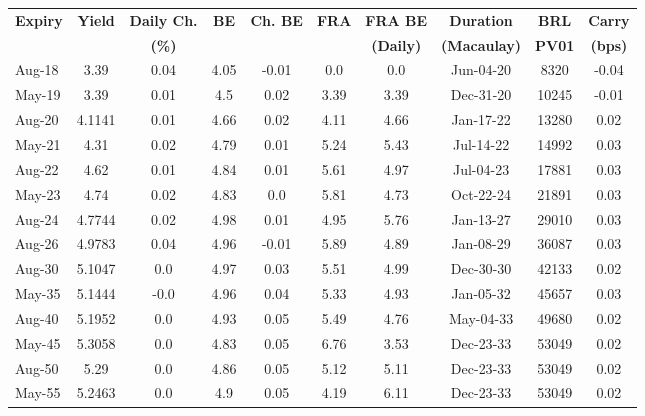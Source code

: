 \documentclass[article,crop=false]{standalone}%
\begin{document}
%
\normalsize%
\setlength{\tabcolsep}{0.15cm}%
\begin{tabular}[h]{l|c c|c c|c c|c c c}%
\hline%
\rowcolor{white}%
\textbf{Expiry}&\textbf{Yield}&\textbf{Daily Ch.}&\textbf{BE}&\textbf{Ch. BE}&\textbf{FRA}&\textbf{FRA BE}&\textbf{Duration}&\textbf{BRL}&\textbf{Carry}\\%
\rowcolor{white}%
\textbf{}&\textbf{}&\textbf{(\%)}&\textbf{}&\textbf{}&\textbf{}&\textbf{(Daily)}&\textbf{(Macaulay)}&\textbf{PV01}&\textbf{(bps)}\\%
\hline%
\rowcolor{lightgray}%
Aug{-}18&3.39&0.04&4.05&{-}0.01&0.0&0.0&Jun{-}04{-}20&8320&{-}0.04\\%
\rowcolor{white}%
May{-}19&3.39&0.01&4.5&0.02&3.39&3.39&Dec{-}31{-}20&10245&{-}0.01\\%
\rowcolor{lightgray}%
Aug{-}20&4.1141&0.01&4.66&0.02&4.11&4.66&Jan{-}17{-}22&13280&0.02\\%
\rowcolor{white}%
May{-}21&4.31&0.02&4.79&0.01&5.24&5.43&Jul{-}14{-}22&14992&0.03\\%
\rowcolor{lightgray}%
Aug{-}22&4.62&0.01&4.84&0.01&5.61&4.97&Jul{-}04{-}23&17881&0.03\\%
\rowcolor{white}%
May{-}23&4.74&0.02&4.83&0.0&5.81&4.73&Oct{-}22{-}24&21891&0.03\\%
\rowcolor{lightgray}%
Aug{-}24&4.7744&0.02&4.98&0.01&4.95&5.76&Jan{-}13{-}27&29010&0.03\\%
\rowcolor{white}%
Aug{-}26&4.9783&0.04&4.96&{-}0.01&5.89&4.89&Jan{-}08{-}29&36087&0.03\\%
\rowcolor{lightgray}%
Aug{-}30&5.1047&0.0&4.97&0.03&5.51&4.99&Dec{-}30{-}30&42133&0.02\\%
\rowcolor{white}%
May{-}35&5.1444&{-}0.0&4.96&0.04&5.33&4.93&Jan{-}05{-}32&45657&0.03\\%
\rowcolor{lightgray}%
Aug{-}40&5.1952&0.0&4.93&0.05&5.49&4.76&May{-}04{-}33&49680&0.02\\%
\rowcolor{white}%
May{-}45&5.3058&0.0&4.83&0.05&6.76&3.53&Dec{-}23{-}33&53049&0.02\\%
\rowcolor{lightgray}%
Aug{-}50&5.29&0.0&4.86&0.05&5.12&5.11&Dec{-}23{-}33&53049&0.02\\%
\rowcolor{white}%
May{-}55&5.2463&0.0&4.9&0.05&4.19&6.11&Dec{-}23{-}33&53049&0.02\\%
\hline%
\end{tabular}%
\end{document}
